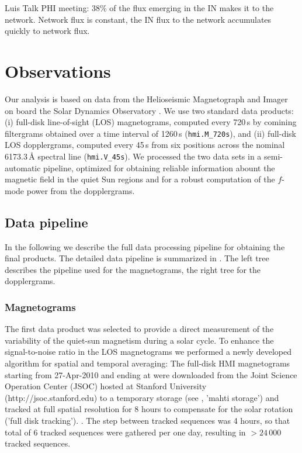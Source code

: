 \documentclass{aa}
\begin{document}
\cite[]{2019LRSP...16....1B}
Luis Talk PHI meeting: 38\% of the flux emerging in the IN makes it to the network. Network flux is constant, the IN flux to the network accumulates quickly to network flux.

\cite[]{2015ApJ...806..174J}

\cite[]{2013A&A...555A..33B}

\cite[]{2021arXiv210508657F}

\cite[]{2021arXiv210514533R}

\cite[]{ballot2021changes}


\section{Observations}

Our analysis is based on data from the Helioseismic Magnetograph and Imager \cite[HMI,][]{2012SoPh..275..207S,2012SoPh..275..229S} on board the Solar Dynamics Observatory \cite[SDO,][]{2012SoPh..275....3P}. We use two standard data products: (i) full-disk line-of-sight (LOS) magnetograms, computed every 720\,s by comining filtergrams obtained over a time interval of 1260\,s (\texttt{hmi.M\_720s}), and (ii) full-disk LOS dopplergrams, computed every 45\,s from six positions across the nominal 6173.3\,\AA{} spectral line (\texttt{hmi.V\_45s}). We processed the two data sets in a semi-automatic pipeline, optimized for obtaining reliable information abount the magnetic field in the quiet Sun regions and for a robust computation of the $f$-mode power from the dopplergrams. 

\subsection{Data pipeline}

In the following we describe the full data processing pipeline for obtaining the final products. The detailed data pipeline is summarized in . The left tree describes the pipeline used for the magnetograms, the right tree for the dopplergrams.


\subsubsection{Magnetograms}

The first data product was selected to provide a direct measurement of the variability of the quiet-sun magnetism during a solar cycle. To enhance the signal-to-noise ratio in the LOS magnetograms we performed a newly developed algorithm for spatial and temporal averaging: The full-disk HMI magnetograms starting from 27-Apr-2010 and ending at  were downloaded from the Joint Science Operation Center (JSOC) hosted at Stanford University (http://jsoc.stanford.edu) to a temporary storage (see , 'mahti storage') and tracked at full spatial resolution for 8 hours to compensate for the solar rotation ('full disk tracking').
. 
The step between tracked sequences was 4 hours, so that total of 6 tracked sequences were gathered per one day, resulting in $>24\,000$ tracked sequences. 
\end{document}
